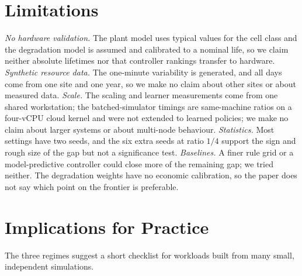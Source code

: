\documentclass[conference]{IEEEtran}
\begin{document}
\section{Limitations}\label{sec:limits}
\emph{No hardware validation.} The plant model uses typical values for the cell class and the degradation model is
assumed and calibrated to a nominal life, so we claim neither absolute lifetimes nor that controller rankings
transfer to hardware. \emph{Synthetic resource data.} The one-minute variability is generated, and all days come
from one site and one year, so we make no claim about other sites or about measured data. \emph{Scale.} The scaling
and learner measurements come from one shared workstation; the batched-simulator timings are same-machine ratios on
a four-vCPU cloud kernel and were not extended to learned policies; we make no claim about larger systems or about
multi-node behaviour. \emph{Statistics.} Most settings have two seeds, and the six extra seeds at ratio $1/4$
support the sign and rough size of the gap but not a significance test. \emph{Baselines.} A finer rule grid or a
model-predictive controller could close more of the remaining gap; we tried neither. The degradation weights have
no economic calibration, so the paper does not say which point on the frontier is preferable.

\section{Implications for Practice}\label{sec:practice}
The three regimes suggest a short checklist for workloads built from many small, independent simulations.
\end{document}
